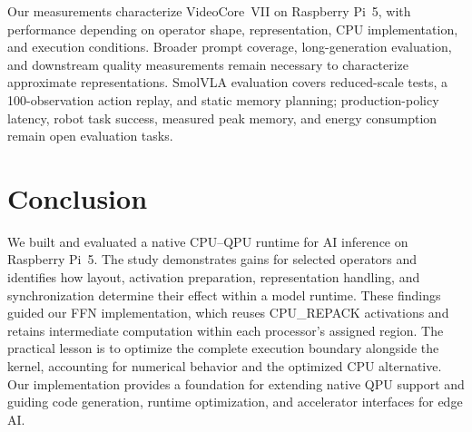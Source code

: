 \documentclass[sigplan,screen,review]{acmart}
\begin{document}
Our measurements characterize VideoCore~VII on Raspberry Pi~5, with performance depending on operator shape, representation, CPU implementation, and execution conditions. Broader prompt coverage, long-generation evaluation, and downstream quality measurements remain necessary to characterize approximate representations. SmolVLA evaluation covers reduced-scale tests, a 100-observation action replay, and static memory planning; production-policy latency, robot task success, measured peak memory, and energy consumption remain open evaluation tasks.

\section{Conclusion}

We built and evaluated a native CPU--QPU runtime for AI inference on Raspberry Pi~5. 
The study demonstrates gains for selected operators and identifies how layout, activation preparation, representation handling, and synchronization determine their effect within a model runtime. These findings guided our FFN implementation, which reuses CPU\_REPACK activations and retains intermediate computation within each processor's assigned region. The practical lesson is to optimize the complete execution boundary alongside the kernel, accounting for numerical behavior and the optimized CPU alternative. Our implementation provides a foundation for extending native QPU support and guiding code generation, runtime optimization, and accelerator interfaces for edge AI.
\end{document}
